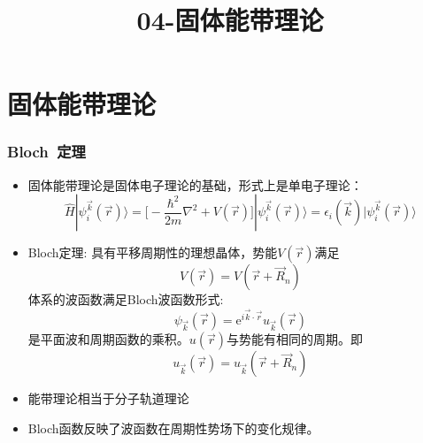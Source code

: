 

\title{04-固体能带理论}
\section{固体能带理论}       %
\frame
{
	\frametitle{\textrm{Bloch~}定理}
\begin{itemize}%
   \setlength{\itemsep}{8pt}
   \item 固体能带理论是固体电子理论的基础，形式上是单电子理论：
    $$\hat H |\psi_i^{\vec k}(\vec r)\rangle=\bigg[-\dfrac{\hbar^2}{2m}\nabla^2+V(\vec r)\bigg]|\psi_i^{\vec k}(\vec r)\rangle=\epsilon_i(\vec k)|\psi_i^{\vec k}(\vec r)\rangle$$
  \item \textrm{Bloch}定理:
具有平移周期性的理想晶体，势能$V(\vec r)$满足$$V(\vec r)=V(\vec r+\vec R_n)$$
体系的波函数满足\textrm{Bloch}波函数形式:$$\psi_{\vec k}(\vec r)=\textrm{e}^{i\vec k\cdot\vec r}u_{\vec k}(\vec r)$$
是平面波和周期函数的乘积。$u(\vec r)$与势能有相同的周期。即$$u_{\vec k}(\vec r)=u_{\vec k}(\vec r+\vec R_n)$$
  \item 能带理论相当于分子轨道理论
\item \textrm{Bloch}函数反映了波函数在周期性势场下的变化规律。
\end{itemize}
}

